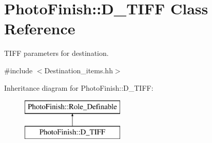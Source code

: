 \hypertarget{class_photo_finish_1_1_d___t_i_f_f}{}\section{Photo\+Finish\+:\+:D\+\_\+\+T\+I\+FF Class Reference}
\label{class_photo_finish_1_1_d___t_i_f_f}


T\+I\+FF parameters for destination.  




{\ttfamily \#include $<$Destination\+\_\+items.\+hh$>$}

Inheritance diagram for Photo\+Finish\+:\+:D\+\_\+\+T\+I\+FF\+:\begin{figure}[H]
\begin{center}
\leavevmode
\includegraphics[height=2.000000cm]{class_photo_finish_1_1_d___t_i_f_f}
\end{center}
\end{figure}
